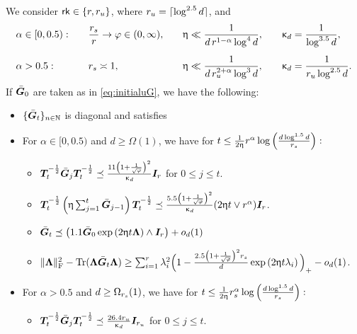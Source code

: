 \begin{proposition}
\label{prop:goodeventres}
We consider $\mathsf{rk} \in \{ r, r_u \}$,  where $r_u = \lceil\log^{2.5} d\rceil$,  and
\begin{alignat}{4}
&\alpha \in [0, 0.5): \quad 
&& \frac{r_s}{r} \to \varphi \in (0, \infty),  \quad  
&&  \upeta \ll \frac{1}{d\, r^{1 - \alpha} \log^4 d},  \quad  
&&  \upkappa_d = \frac{1}{\log^{3.5} d},  
    \\[0.5em]
& \alpha > 0.5: \quad 
&& r_s  \asymp 1, \quad  
&&\upeta \ll \frac{1}{d\, r_u^{2+\alpha} \log^3 d}, \quad  
&& \upkappa_d = \frac{1}{r_u \log^{2.5} d}. 
\end{alignat}
If   $\bar{\boldsymbol{G}}_{0}$ are taken as  in  \eqref{eq:initialuG}, we have the following:
\begin{itemize}[leftmargin = *]
\item  $\{ \bar{\boldsymbol{G}}_{t} \}_{n \in \mathbb{N}}$ is diagonal  and satisfies
\item   For $\alpha \in [0,0.5)$ and $d \geq \Omega(1)$, we have for $t\leq \frac{1}{2\upeta} r^{\alpha} \log \left( \frac{d \log^{1.5} d}{r_s}  \right):$
\begin{itemize}
\item   $\boldsymbol{T}_t^{- \frac{1}{2}} \bar{\boldsymbol{G}}_{j} \boldsymbol{T}_t^{- \frac{1}{2}} \preceq  \frac{11  \left(1 + \frac{1}{\sqrt{\varphi}} \right)^2 }{\upkappa_d}   \boldsymbol{I}_r$ for $0 \leq j \leq t$.
\item  $\boldsymbol{T}_t^{- \frac{1}{2}} \left( \upeta \sum_{j = 1}^t \bar{\boldsymbol{G}}_{j - 1} \right) \boldsymbol{T}_t^{- \frac{1}{2}} \preceq \frac{5.5  \left(1 + \frac{1}{\sqrt{\varphi}} \right)^2}{\upkappa_d} (2 \upeta t\vee r^{\alpha})   \boldsymbol{I}_r$.
\item  $ \bar{\boldsymbol{G}}_{t}   \preceq \left(  1.1 \bar{\boldsymbol{G}}_{0}  \exp \left(  2  \upeta t  \boldsymbol{\Lambda}  \right) \wedge  \boldsymbol{I}_r \right) +    o_d(1)$
\item $\lVert\boldsymbol{\Lambda}\rVert_\mathrm{F}^2 - \text{Tr}(\boldsymbol{\Lambda} \bar{\boldsymbol{G}}_{t} \boldsymbol{\Lambda} ) \geq \sum_{i = 1}^r  \lambda_i^2 \Big(  1 - \tfrac{2.5  \left(1 + \frac{1}{\sqrt{\varphi}} \right)^2  r_s}{d}   \exp \left(  2  \upeta t \lambda_i  \right) \Big)_{+}  -   o_d(1)$.
\end{itemize}
\item For $\alpha> 0.5$ and $d \geq \Omega_{r_s}(1)$,  we have   for  $t\leq \frac{1}{2\upeta} r_s^{\alpha} \log \left( \frac{d \log^{1.5} d}{r_s}  \right):$
\begin{itemize}
\item   $\boldsymbol{T}_t^{- \frac{1}{2}} \bar{\boldsymbol{G}}_{j} \boldsymbol{T}_t^{- \frac{1}{2}} \preceq  \frac{26.4 r_u}{\upkappa_d}   \boldsymbol{I}_{r_u}$ for $0 \leq j \leq t$.

\end{itemize}
\end{itemize}
\end{proposition}
